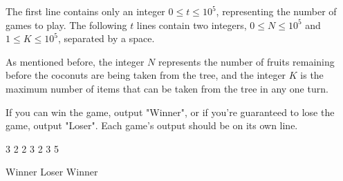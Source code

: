 \documentclass{article}
\begin{document}
\begin{inputDescription}
The first line contains only an integer $0 \leq t \leq 10^5$, representing the number of games to play. The following $t$ lines contain two integers, $0 \leq N \leq 10^5$ and $1 \leq K \leq 10^5$, separated by a space.

As mentioned before, the integer $N$ represents the number of fruits remaining before the coconuts are being taken from the tree, and the integer $K$ is the maximum number of items that can be taken from the tree in any one turn.

\end{inputDescription}

\begin{outputDescription}
If you can win the game, output "Winner", or if you're guaranteed to lose the game, output "Loser". Each game's output should be on its own line.

\end{outputDescription}

\begin{sampleInput}

3
2 2
3 2
3 5
\end{sampleInput}
\begin{sampleOutput}

Winner
Loser
Winner
\end{sampleOutput}
\end{document}
